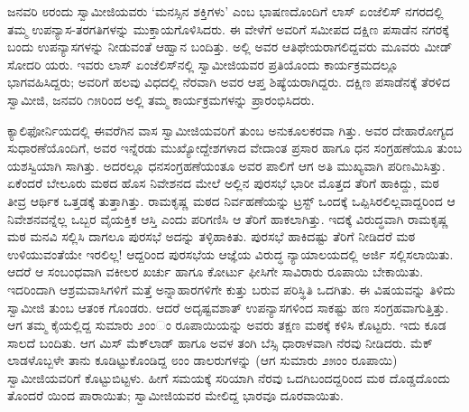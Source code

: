 ಜನವರಿ ೮ರಂದು ಸ್ವಾಮೀಜಿಯವರು ‘ಮನಸ್ಸಿನ ಶಕ್ತಿಗಳು’ ಎಂಬ ಭಾಷಣದೊಂದಿಗೆ ಲಾಸ್ ಏಂಜೆಲಿಸ್ ನಗರದಲ್ಲಿ ತಮ್ಮ ಉಪನ್ಯಾಸ-ತರಗತಿಗಳನ್ನು ಮುಕ್ತಾಯಗೊಳಿಸಿದರು. ಈ ವೇಳೆಗೆ ಅವರಿಗೆ ಸಮೀಪದ ದಕ್ಷಿಣ ಪಸಾಡೆನ ನಗರಕ್ಕೆ ಬಂದು ಉಪನ್ಯಾಸಗಳನ್ನು ನೀಡುವಂತೆ ಆಹ್ವಾನ ಬಂದಿತ್ತು. ಅಲ್ಲಿ ಅವರ ಆತಿಥೇಯರಾಗಲಿದ್ದವರು ಮೂವರು ಮೀಡ್ ಸೋದರಿ ಯರು. ಇವರು ಲಾಸ್ ಏಂಜೆಲಿಸ್​ನಲ್ಲಿ ಸ್ವಾಮೀಜಿಯವರ ಪ್ರತಿಯೊಂದು ಕಾರ್ಯಕ್ರಮದಲ್ಲೂ ಭಾಗವಹಿಸಿದ್ದರು; ಅವರಿಗೆ ಹಲವು ವಿಧದಲ್ಲಿ ನೆರವಾಗಿ ಅವರ ಆಪ್ತ ಶಿಷ್ಯೆಯರಾಗಿದ್ದರು. ದಕ್ಷಿಣ ಪಸಾಡೆನಕ್ಕೆ ತೆರಳಿದ ಸ್ವಾಮೀಜಿ, ಜನವರಿ ೧೫ರಿಂದ ಅಲ್ಲಿ ತಮ್ಮ ಕಾರ್ಯಕ್ರಮಗಳನ್ನು ಪ್ರಾರಂಭಿಸಿದರು.

ಕ್ಯಾಲಿಫೋರ್ನಿಯದಲ್ಲಿ ಈವರೆಗಿನ ವಾಸ ಸ್ವಾಮೀಜಿಯವರಿಗೆ ತುಂಬ ಅನುಕೂಲಕರವಾ ಗಿತ್ತು. ಅವರ ದೇಹಾರೋಗ್ಯದ ಸುಧಾರಣೆಯೊಂದಿಗೆ, ಅವರ ಇನ್ನೆರಡು ಮುಖ್ಯೋದ್ದೇಶಗಳಾದ ವೇದಾಂತ ಪ್ರಸಾರ ಹಾಗೂ ಧನ ಸಂಗ್ರಹಣೆಯೂ ತುಂಬ ಯಶಸ್ವಿಯಾಗಿ ಸಾಗಿತ್ತು. ಅದರಲ್ಲೂ ಧನಸಂಗ್ರಹಣೆಯಂತೂ ಅವರ ಪಾಲಿಗೆ ಆಗ ಅತಿ ಮುಖ್ಯವಾಗಿ ಪರಿಣಮಿಸಿತ್ತು. ಏಕೆಂದರೆ ಬೇಲೂರು ಮಠದ ಹೊಸ ನಿವೇಶನದ ಮೇಲೆ ಅಲ್ಲಿನ ಪುರಸಭೆ ಭಾರೀ ಮೊತ್ತದ ತೆರಿಗೆ ಹಾಕಿದ್ದು, ಮಠ ತೀವ್ರ ಆರ್ಥಿಕ ಒತ್ತಡಕ್ಕೆ ತುತ್ತಾಗಿತ್ತು. ರಾಮಕೃಷ್ಣ ಮಠದ ನಿರ್ವಹಣೆಯನ್ನು ಟ್ರಸ್ಟ್ ಒಂದಕ್ಕೆ ಒಪ್ಪಿಸಿರಲಿಲ್ಲವಾದ್ದರಿಂದ ಆ ನಿವೇಶನವನ್ನೆಲ್ಲ ಒಬ್ಬರ ವೈಯಕ್ತಿಕ ಆಸ್ತಿ ಎಂದು ಪರಿಗಣಿಸಿ ಆ ತೆರಿಗೆ ಹಾಕಲಾಗಿತ್ತು. ಇದಕ್ಕೆ ವಿರುದ್ಧವಾಗಿ ರಾಮಕೃಷ್ಣ ಮಠ ಮನವಿ ಸಲ್ಲಿಸಿ ದಾಗಲೂ ಪುರಸಭೆ ಅದನ್ನು ತಳ್ಳಿಹಾಕಿತು. ಪುರಸಭೆ ಹಾಕಿದಷ್ಟು ತೆರಿಗೆ ನೀಡಿದರೆ ಮಠ ಉಳಿಯುವಂತೆಯೇ ಇರಲಿಲ್ಲ! ಆದ್ದರಿಂದ ಪುರಸಭೆಯ ಆಜ್ಞೆಯ ವಿರುದ್ಧ ನ್ಯಾಯಾಲಯದಲ್ಲಿ ಅರ್ಜಿ ಸಲ್ಲಿಸಲಾಯಿತು. ಆದರೆ ಆ ಸಂಬಂಧವಾಗಿ ವಕೀಲರ ಖರ್ಚು ಹಾಗೂ ಕೋರ್ಟು ಫೀಸಿಗೇ ಸಾವಿರಾರು ರೂಪಾಯಿ ಬೇಕಾಯಿತು. ಇದರಿಂದಾಗಿ ಆಶ್ರಮವಾಸಿಗಳಿಗೆ ಮತ್ತೆ ಅನ್ನಾಹಾರಗಳಿಗೇ ಕುತ್ತು ಬರುವ ಪರಿಸ್ಥಿತಿ ಒದಗಿತು. ಈ ವಿಷಯವನ್ನು ತಿಳಿದು ಸ್ವಾಮೀಜಿ ತುಂಬ ಆತಂಕ ಗೊಂಡರು. ಆದರೆ ಅದೃಷ್ಟವಶಾತ್ ಉಪನ್ಯಾಸಗಳಿಂದ ಸಾಕಷ್ಟು ಹಣ ಸಂಗ್ರಹವಾಗುತ್ತಿತ್ತು. ಆಗ ತಮ್ಮ ಕೈಯಲ್ಲಿದ್ದ ಸುಮಾರು ೨ಂಂಂ ರೂಪಾಯಿಯನ್ನು ಅವರು ತಕ್ಷಣ ಮಠಕ್ಕೆ ಕಳಿಸಿ ಕೊಟ್ಟರು. ಇದು ಕೂಡ ಸಾಲದೆ ಬಂದಿತು. ಆಗ ಮಿಸ್ ಮೆಕ್​ಲಾಡ್ ಹಾಗೂ ಅವಳ ತಂಗಿ ಬೆಸ್ಸಿ ಧಾರಾಳವಾಗಿ ನೆರವು ನೀಡಿದರು. ಮೆಕ್​ಲಾಡಳೊಬ್ಬಳೇ ತಾನು ಕೂಡಿಟ್ಟುಕೊಂಡಿದ್ದ ೮ಂಂ ಡಾಲರುಗಳನ್ನು (ಆಗ ಸುಮಾರು ೨೫ಂಂ ರೂಪಾಯಿ) ಸ್ವಾಮೀಜಿಯವರಿಗೆ ಕೊಟ್ಟುಬಿಟ್ಟಳು. ಹೀಗೆ ಸಮಯಕ್ಕೆ ಸರಿಯಾಗಿ ನೆರವು ಒದಗಿಬಂದದ್ದರಿಂದ ಮಠ ದೊಡ್ಡದೊಂದು ತೊಂದರೆ ಯಿಂದ ಪಾರಾಯಿತು; ಸ್ವಾಮೀಜಿಯವರ ಮೇಲಿದ್ದ ಭಾರವೂ ದೂರವಾಯಿತು.

